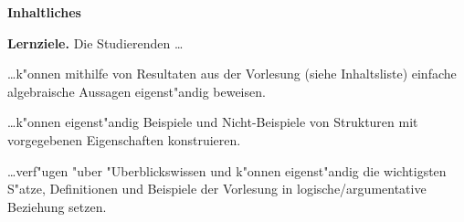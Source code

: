 \documentclass[a4,11pt]{article}
\begin{document}
\vspace*{-17mm}
{
\kopf
}
\enlargethispage*{25mm}

\begin{center}
  \LARGE \bfseries Inhaltliches 
\end{center}

\bigskip

{\bfseries Lernziele.}
Die Studierenden \ldots
\begin{compactitem}
  
  
\item \ldots k"onnen mithilfe von Resultaten aus der
  Vorlesung (siehe Inhaltsliste) einfache algebraische Aussagen
  eigenst"andig beweisen.
\item \ldots k"onnen eigenst"andig Beispiele und Nicht-Beispiele von
  Strukturen mit vorgegebenen Eigenschaften konstruieren.
\item \ldots verf"ugen "uber "Uberblickswissen und k"onnen
  eigenst"andig die wichtigsten S"atze, Definitionen und Beispiele der
  Vorlesung in logische/argumentative Beziehung setzen.
\end{compactitem}
\bigskip
\end{document}
